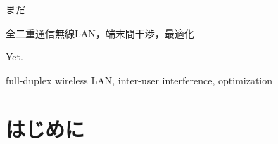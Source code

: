 \documentclass[paper]{ieicej}
\begin{document}
\begin{jabstract}
まだ
\end{jabstract}
\begin{jkeyword}
全二重通信無線LAN，端末間干渉，最適化
\end{jkeyword}
\begin{eabstract}
 Yet.
\end{eabstract}
\begin{ekeyword}
full-duplex wireless LAN, inter-user interference, optimization
\end{ekeyword}

\maketitle

\section{はじめに}

%
%
\end{document}
